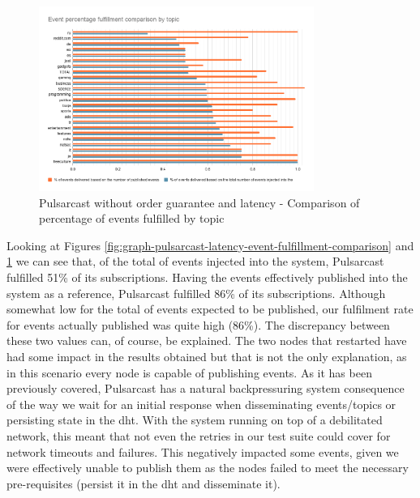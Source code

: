 \begin{figure}[!htb]
  \centering
  \includegraphics[width=0.8\textwidth]{../images/graph-pulsarcast-latency-event-percentage-fulfillment-comparison.png}
  \caption{Pulsarcast without order guarantee and latency - Comparison of percentage of events fulfilled by topic}
  \label{fig:graph-pulsarcast-latency-event-percentage-fulfillment-comparison}
\end{figure}

Looking at Figures
\ref{fig:graph-pulsarcast-latency-event-fulfillment-comparison} and
\ref{fig:graph-pulsarcast-latency-event-percentage-fulfillment-comparison} we
can see that, of the total of events injected into the system, Pulsarcast
fulfilled 51\% of its subscriptions. Having the events effectively published
into the system as a reference, Pulsarcast fulfilled 86\% of its subscriptions.
Although somewhat low for the total of events expected to be published, our
fulfilment rate for events actually published was quite high (86\%). The
discrepancy between these two values can, of course, be explained.  The two
nodes that restarted have had some impact in the results obtained but that is
not the only explanation, as in this scenario every node is capable of
publishing events. As it has been previously covered, Pulsarcast has a natural
backpressuring system consequence of the way we wait for an initial response
when disseminating events/topics or persisting state in the \acrshort{dht}.
With the system running on top of a debilitated network, this meant that not
even the retries in our test suite could cover for network timeouts and
failures.  This negatively impacted some events, given we were effectively
unable to publish them as the nodes failed to meet the necessary pre-requisites
(persist it in the \acrshort{dht} and disseminate it).

